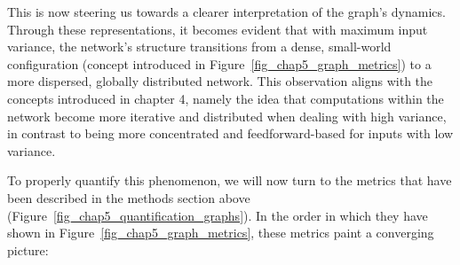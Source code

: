 This is now steering us towards a clearer interpretation of the graph's dynamics. Through these representations, it becomes evident that with maximum input variance, the network's structure transitions from a dense, small-world configuration (concept introduced in Figure~\ref{fig_chap5_graph_metrics}) to a more dispersed, globally distributed network. This observation aligns with the concepts introduced in chapter 4, namely the idea that computations within the network become more iterative and distributed when dealing with high variance, in contrast to being more concentrated and feedforward-based for inputs with low variance. 

To properly quantify this phenomenon, we will now turn to the metrics that have been described in the methods section above (Figure~\ref{fig_chap5_quantification_graphs}). In the order in which they have shown in Figure~\ref{fig_chap5_graph_metrics}, these metrics paint a converging picture:
